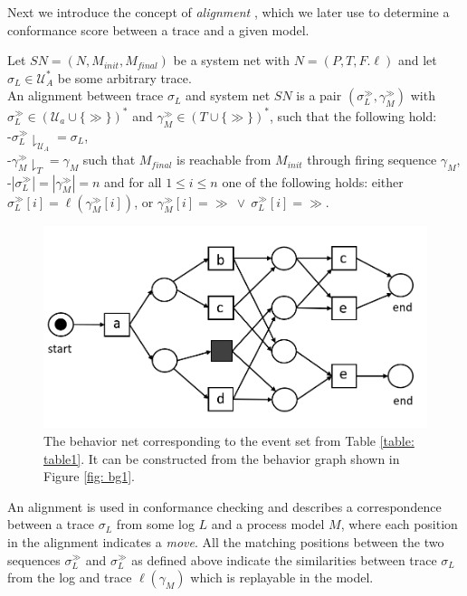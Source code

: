 Next we introduce the concept of \textit{alignment} \cite{alignment}, which we later use to determine a conformance score between a trace and a given model.
\begin{definition}[Alignment]
Let $SN=(N,M_{init},M_{final})$ be a system net with $N=(P,T,F.\ell)$ 
and let $\sigma_L \in \mathcal{U}_A^*$ be some arbitrary trace.\\
An alignment between trace $\sigma_L$ and system net $SN$ is a pair $(\sigma_L^{\gg},\gamma_M^{\gg})$ with $\sigma_L^{\gg} \in (\mathcal{U}_a \cup \{\gg\})^*$ and $\gamma_M^{\gg} \in (T \cup \{\gg\})^*$, such that the following hold:\\
-$\sigma_L^{\gg} \downharpoonright_{\mathcal{U}_A} = \sigma_L$,\\
-$\gamma_M^{\gg} \downharpoonright_T = \gamma_M$ such that $M_{final}$ is reachable from $M_{init}$ through firing sequence $\gamma_M$,\\
-$|\sigma_L^{\gg}| = |\gamma_M^{\gg}| = n$ and for all $1 \leq i \leq n$ one of the following holds:
either $\sigma_L^{\gg}[i] = \ell(\gamma_M^{\gg}[i])$, or $\gamma_M^{\gg}[i] = \gg ~ \vee ~ \sigma_L^{\gg}[i] = \gg $.
\end{definition}
%
%
%
%
\begin{figure}[h!]
	\centering
	\includegraphics[width=0.8 \columnwidth]{figures/bn1.png}
	\caption{The behavior net corresponding to the event set from Table \ref{table: table1}. It can be constructed from the behavior graph shown in Figure \ref{fig: bg1}.}
	\label{fig: bn1}
\end{figure}
%
%
%
%
%
An alignment is used in conformance checking and describes a correspondence between a trace $\sigma_L$ from some log $L$ and a process model $M$, where each position in the alignment indicates a \textit{move}.
All the matching positions between the two sequences $\sigma_L^{\gg}$ and $\sigma_L^{\gg}$ as defined above indicate the similarities between trace $\sigma_L$ from the log and trace $\ell(\gamma_M)$ which is replayable in the model.
